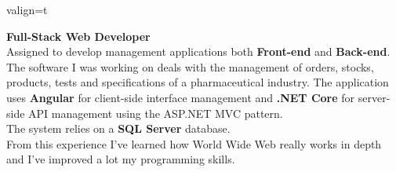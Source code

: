 \documentclass[a4paper,10pt]{article}
\begin{document}
\begin{adjustbox}{valign=t}
\begin{minipage}{0.6\textwidth}
\begin{description}
	\textbf{Full-Stack Web Developer}\\
	
	Assigned to develop management applications both \textbf{Front-end} and \textbf{Back-end}.\\
    The software I was working on deals with the management of orders, stocks, products, tests and specifications of a pharmaceutical industry. The application uses \textbf{Angular} for client-side interface management and \textbf{.NET Core} for server-side API management using the ASP.NET MVC pattern.\\
    The system relies on a \textbf{SQL Server} database.\\
    From this experience I've learned how World Wide Web really works in depth and I've improved a lot my programming skills. 
\end{description}

\end{minipage}
\end{adjustbox}

\newpage
\thispagestyle{empty}
\end{document}
